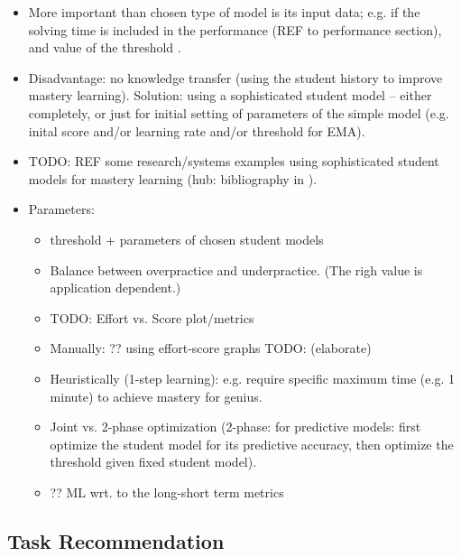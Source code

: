\begin{itemize}
\item More important than chosen type of model is its input data;
  e.g. if the solving time is included in the performance (REF to performance section),
  and value of the threshold
  \cite{alg.mastery}. %
\item Disadvantage: no knowledge transfer (using the student history to improve
  mastery learning). Solution: using a sophisticated student model -- either completely,
  or just for initial setting of parameters of the simple model
  (e.g. inital score and/or learning rate and/or threshold for EMA).
\item TODO: REF some research/systems examples using sophisticated student models
  for mastery learning (hub: bibliography in \cite{alg.mastery}).
\item Parameters:
\begin{itemize}
\item threshold + parameters of chosen student models
\item Balance between overpractice and underpractice. (The righ value is application dependent.)
\item TODO: Effort vs. Score plot/metrics
  \cite{evaluation-leopard, learner-models-integration-skills}
\item Manually: ?? using effort-score graphs \cite{alg.mastery} TODO: (elaborate)
\item Heuristically (1-step learning): e.g. require specific maximum time (e.g. 1 minute)
  to achieve mastery for genius.
\item Joint vs. 2-phase optimization
  (2-phase: for predictive models: first optimize the student model for its
  predictive accuracy, then optimize the threshold given fixed student model).
\item ?? ML wrt. to the long-short term metrics
\end{itemize}
\end{itemize}



\subsection{Task Recommendation}  %
\label{sec:task-recommendation}

